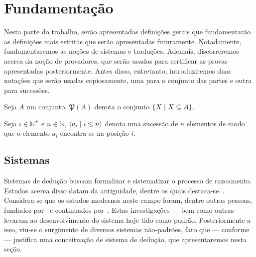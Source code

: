 \chapter{Fundamentação}

Nesta parte do trabalho, serão apresentadas definições gerais que fundamentarão as definições mais estritas que serão apresentadas futuramente. Notadamente, fundamentaremos as noções de sistemas e traduções. Ademais, discorreremos acerca da noção de provadores, que serão usados para certificar as provas apresentadas posteriormente. Antes disso, entretanto, introduziremos duas notações que serão usadas copiosamente, uma para o conjunto das partes e outra para sucessões.

\begin{tcolorbox}[enhanced jigsaw, breakable, sharp corners, colframe=black, colback=white, boxrule=0.5pt, left=1.5mm, right=1.5mm, top=1.5mm, bottom=1.5mm]
\begin{notation}
    Seja $A$ um conjunto, $\mathfrak{P}(A)$ denota o conjunto $\left\{X\mid X\subseteq A\right\}$.
\end{notation}
\end{tcolorbox}

\begin{tcolorbox}[enhanced jigsaw, breakable, sharp corners, colframe=black, colback=white, boxrule=0.5pt, left=1.5mm, right=1.5mm, top=1.5mm, bottom=1.5mm]
\begin{notation}
    Seja $i\in\mathbb{N}^+$ e $n\in\mathbb{N}$, $\langle a_i\mid i\leq n\rangle$ denota uma sucessão de $n$ elementos de modo que o elemento $a_i$ encontra-se na posição $i$.
\end{notation}
\end{tcolorbox}

\section{Sistemas}

Sistemas de dedução buscam formalizar e sistematizar o processo de razoamento. Estudos acerca disso datam da antiguidade, dentre os quais destaca-se~\cite{Aristotle}. Considera-se que os estudos modernos neste campo foram, dentre outras pessoas, fundados por~\cite{Frege} e continuados por~\cite{Russel-A,Russel-B,Russel-C}. Estas investigações --- bem como outras --- levaram ao desenvolvimento do sistema hoje tido como padrão. Posteriormente a isso, viu-se o surgimento de diversos sistemas não-padrões, fato que --- conforme~\cite{Beziau-B} --- justifica uma conceituação de sistema de dedução, que apresentaremos nesta seção.

